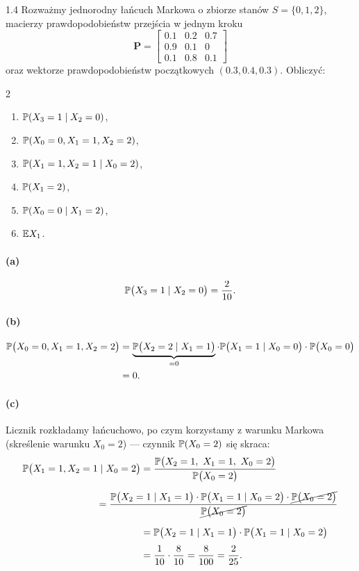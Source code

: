 \documentclass[dvipsnames]{book}
\begin{document}
\begin{zadanie}{1.4}
Rozważmy jednorodny łańcuch Markowa o zbiorze stanów $S = \{0,1,2\}$, macierzy
prawdopodobieństw przejścia w jednym kroku
\[
  \mathbf{P} =
  \begin{bmatrix}
    0.1 & 0.2 & 0.7 \\
    0.9 & 0.1 & 0 \\
    0.1 & 0.8 & 0.1
  \end{bmatrix}
\]
oraz wektorze prawdopodobieństw początkowych $(0.3, 0.4, 0.3)$. Obliczyć:
\begin{multicols}{2}
\begin{enumerate}
  \item $\P(X_3 = 1 \mid X_2 = 0)$,
  \item $\P(X_0 = 0, X_1 = 1, X_2 = 2)$,
  \item $\P(X_1 = 1, X_2 = 1 \mid X_0 = 2)$,
  \item $\P(X_1 = 2)$,
  \item $\P(X_0 = 0 \mid X_1 = 2)$,
  \item $\E X_1$.
\end{enumerate}
\end{multicols}
\end{zadanie}

\paragraph{(a)}
\[
  \P\big(X_3 = 1 \mid X_2 = 0\big) = \frac{2}{10}.
\]

\paragraph{(b)}
\begin{align*}
  \P\big(X_0 = 0, X_1 = 1, X_2 = 2\big)
  &= \underbrace{\P\big(X_2 = 2 \mid X_1 = 1\big)}_{= 0} \cdot
     \P\big(X_1 = 1 \mid X_0 = 0\big) \cdot \P\big(X_0 = 0\big) \\
  &= 0.
\end{align*}

\paragraph{(c)} Licznik rozkładamy łańcuchowo, po czym korzystamy z warunku
Markowa (skreślenie warunku $X_0 = 2$) --- czynnik $\P(X_0 = 2)$ się skraca:
\begin{align*}
  \P\big(X_1 = 1, X_2 = 1 \mid X_0 = 2\big)
  &= \frac{\P\big(X_2 = 1,\ X_1 = 1,\ X_0 = 2\big)}{\P\big(X_0 = 2\big)} \\[2mm]
  &\hspace{-16mm} = \frac{\P\big(X_2 = 1 \mid X_1 = 1\big) \cdot
                          \P\big(X_1 = 1 \mid X_0 = 2\big) \cdot
                          \cancel{\P\big(X_0 = 2\big)}}
                         {\cancel{\P\big(X_0 = 2\big)}} \\[2mm]
  &= \P\big(X_2 = 1 \mid X_1 = 1\big) \cdot \P\big(X_1 = 1 \mid X_0 = 2\big) \\[1mm]
  &= \frac{1}{10} \cdot \frac{8}{10} = \frac{8}{100} = \frac{2}{25}.
\end{align*}
\end{document}
